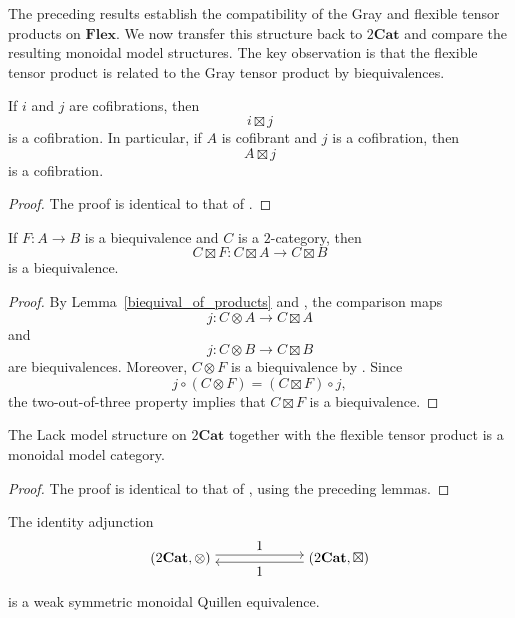 \documentclass{tac}
\begin{document}
The preceding results establish the compatibility of the Gray and
flexible tensor products on $\mathbf{Flex}$. We now transfer this
structure back to $2\mathbf{Cat}$ and compare the resulting monoidal
model structures. The key observation is that the flexible tensor product
is related to the Gray tensor product by biequivalences.

\begin{lemma}
If $i$ and $j$ are cofibrations, then
\[
i\boxtimes j
\]
is a cofibration. In particular, if $A$ is cofibrant and $j$ is a
cofibration, then
\[
A\boxtimes j
\]
is a cofibration.
\end{lemma}

\begin{proof}
The proof is identical to that of \cite[Lemma~7.3]{Lack2002}.
\end{proof}

\begin{lemma}\label{biequival_of_products}
If $F:A\to B$ is a biequivalence and $C$ is a $2$-category, then
\[
C\boxtimes F:C\boxtimes A\longrightarrow C\boxtimes B
\]
is a biequivalence.
\end{lemma}

\begin{proof}
By Lemma~\ref{biequival_of_products} and
\cite[Lemma~7.4]{Lack2002}, the comparison maps
\[
j:C\otimes A\longrightarrow C\boxtimes A
\]
and
\[
j:C\otimes B\longrightarrow C\boxtimes B
\]
are biequivalences. Moreover, $C\otimes F$ is a biequivalence by
\cite[Lemma~7.4]{Lack2002}. Since
\[
j\circ(C\otimes F)
=
(C\boxtimes F)\circ j,
\]
the two-out-of-three property implies that $C\boxtimes F$ is a
biequivalence.
\end{proof}

\begin{theorem}\label{flex_provides_mon_mod_structr}
The Lack model structure on $2\mathbf{Cat}$ together with the flexible
tensor product is a monoidal model category.
\end{theorem}

\begin{proof}
The proof is identical to that of
\cite[Theorem~7.5]{Lack2002}, using the preceding lemmas.
\end{proof}

\begin{theorem}\label{id_ad_is_weak_Quill_equiv}
The identity adjunction
\[
\begin{tikzpicture}[node distance=4cm]
\node (A) {$(2\mathbf{Cat},\otimes)$};
\node (B) [right of=A] {$(2\mathbf{Cat},\boxtimes)$};

\draw[transform canvas={yshift=0.6ex},->] (A) -- node[above] {$1$} (B);
\draw[transform canvas={yshift=-0.6ex},<-] (A) -- node[below] {$1$} (B);
\end{tikzpicture}
\]
is a weak symmetric monoidal Quillen equivalence.
\end{theorem}
\end{document}
